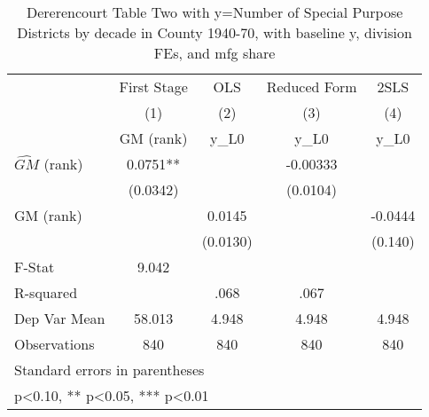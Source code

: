 \begin{table}[htbp]\centering
\def\sym#1{\ifmmode^{#1}\else\(^{#1}\)\fi}
\caption{Dererencourt Table Two with y=Number of Special Purpose Districts by decade in County 1940-70, with baseline y, division FEs, and mfg share}
\begin{tabular}{l*{4}{c}}
\toprule
                    & First Stage   &         OLS   &Reduced Form   &        2SLS   \\
                    &\multicolumn{1}{c}{(1)}&\multicolumn{1}{c}{(2)}&\multicolumn{1}{c}{(3)}&\multicolumn{1}{c}{(4)}\\
                    &\multicolumn{1}{c}{GM  (rank)}&\multicolumn{1}{c}{y\_L0}&\multicolumn{1}{c}{y\_L0}&\multicolumn{1}{c}{y\_L0}\\
\midrule
$\hat{GM}$ (rank)   &      0.0751** &               &    -0.00333   &               \\
                    &    (0.0342)   &               &    (0.0104)   &               \\
\addlinespace
GM  (rank)          &               &      0.0145   &               &     -0.0444   \\
                    &               &    (0.0130)   &               &     (0.140)   \\
\midrule
F-Stat              &       9.042   &               &               &               \\
R-squared           &               &        .068   &        .067   &               \\
Dep Var Mean        &      58.013   &       4.948   &       4.948   &       4.948   \\
Observations        &         840   &         840   &         840   &         840   \\
\bottomrule
\multicolumn{5}{l}{\footnotesize Standard errors in parentheses}\\
\multicolumn{5}{l}{\footnotesize * p<0.10, ** p<0.05, *** p<0.01}\\
\end{tabular}
\end{table}

